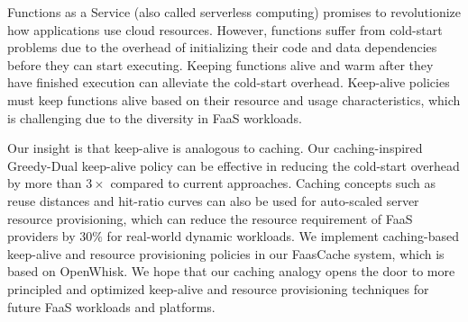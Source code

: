 
Functions as a Service (also called serverless computing) promises to revolutionize how applications use cloud resources. 
However, functions suffer from cold-start problems due to the overhead of initializing their code and data dependencies before they can start executing. 
Keeping functions alive and warm after they have finished execution can alleviate the cold-start overhead. 
Keep-alive policies must keep functions alive based on their resource and usage characteristics, which is challenging due to the diversity in FaaS workloads. 


Our insight is that keep-alive is analogous to caching.
Our caching-inspired Greedy-Dual keep-alive policy can be effective in reducing the cold-start overhead by more than $3\times$ compared to current approaches. 
Caching concepts such as reuse distances and hit-ratio curves can also be used for auto-scaled server resource provisioning, which can reduce the resource requirement of FaaS providers by $30\%$ for real-world dynamic workloads. 
We implement caching-based keep-alive and resource provisioning policies in our FaasCache system, which is based on OpenWhisk. 
We hope that our caching analogy opens the door to more principled and optimized keep-alive and resource provisioning techniques for future FaaS workloads and platforms. 



